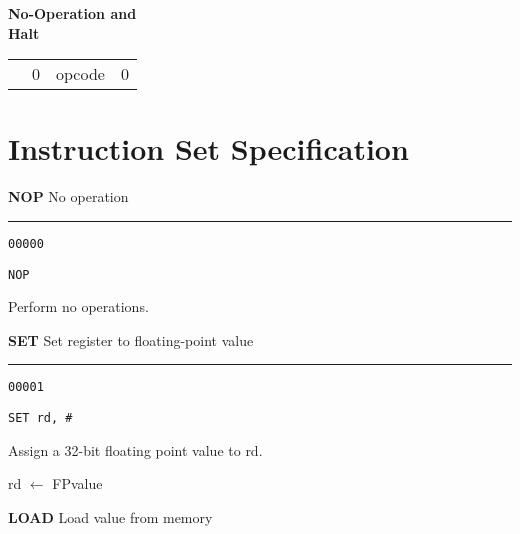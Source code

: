 \documentclass{article}
\begin{document}
\bigskip\bigskip\bigskip

\begin{minipage}[t]{0.3\textwidth}
	\begin{center}
		\textbf{No-Operation and \\ Halt}
	\end{center}
\end{minipage}
\begin{minipage}[t]{110mm}
	\begin{tabular}{p{12mm}|C{2.5mm}|C{12.5mm}|C{75.3mm}|}
		 & 0 & opcode &  0 \\
	\end{tabular}
\end{minipage}

\pagebreak

\section{Instruction Set Specification}

\bigskip\bigskip

\flushleft
\LARGE\textbf{NOP} \large \hfill No operation

\kern-3pt
\noindent\rule{16.5cm}{0.4pt}
\normalsize

{\large
	 \texttt{00000} \par
	\smallbreak
	 \texttt{NOP} \par
	\smallbreak
	 Perform no operations. \par
}

\bigskip\bigskip

\flushleft
\LARGE\textbf{SET} \large \hfill Set register to floating-point value

\kern-3pt
\noindent\rule{16.5cm}{0.4pt}
\normalsize

{\large
	 \texttt{00001} \par
	\smallbreak
	 \texttt{SET rd, \#<32-bit FP value>} \par
	\smallbreak
	 Assign a 32-bit floating point value to rd. \par
	\smallbreak
	 rd $\leftarrow$ FPvalue \par
}

\bigskip\bigskip

\flushleft
\LARGE\textbf{LOAD} \large \hfill Load value from memory
\end{document}
